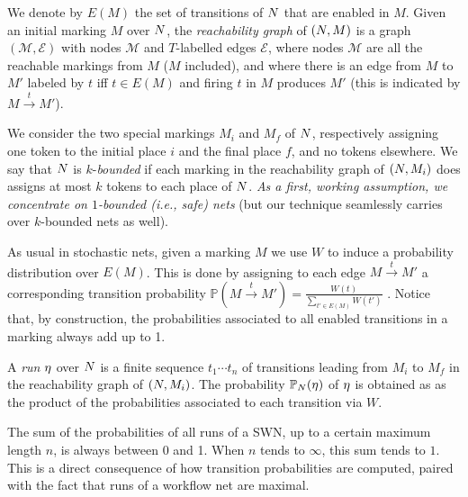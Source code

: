 We denote by $E(M)$ the set of transitions of $N$ that are enabled in $M$. Given an initial marking $M$ over $N$,  the \textit{reachability graph} of $(N,M)$ is a graph $(\mathcal{M},\mathcal{E})$ with nodes $\mathcal{M}$ and $T$-labelled edges $\mathcal{E}$, where nodes $\mathcal{M}$ are all the reachable markings from $M$ ($M$ included), and where there is an edge from $M$ to $M'$ labeled by $t$ iff $t \in E(M)$ and firing $t$ in $M$ produces $M'$ (this is indicated by $M\overset{t}{\to}M'$).

We consider the two special markings $M_i$ and $M_f$ of $N$, respectively assigning one token to the initial place $i$ and the final place $f$, and no tokens elsewhere. We say that $N$ is $k$-\emph{bounded} if each marking in the reachability graph of $(N,M_i)$ does assigns at most $k$ tokens to each place of $N$. \emph{As a first, working assumption, we concentrate on $1$-bounded (i.e., safe) nets} (but our technique seamlessly carries over $k$-bounded nets as well).

As usual in stochastic nets, given a marking $M$ we use $W$ to induce a probability distribution over $E(M)$. This is done by assigning to each edge $M\overset{t}{\to}M'$ a corresponding transition probability $\mathbb{P}\left(M\overset{t}{\to}M'\right)=\frac{W(t)}{\sum_{t'\in E(M)}W(t')}$ \cite{spdwe}. Notice that, by construction, the probabilities associated to all enabled transitions in a marking always add up to 1.

A \emph{run} $\eta$ over $N$ is a finite sequence $t_1\cdots t_n$ of transitions leading from $M_i$ to $M_f$ in the reachability graph of $(N,M_i)$. The probability $\mathbb{P}_{N}(\eta)$ of $\eta$ is obtained as as the product of the probabilities associated to each transition via $W$.

\begin{remark}
\label{rem:collective}
The sum of the probabilities of all runs of a SWN, up to a certain maximum length $n$, is always between 0 and 1. When $n$ tends to $\infty$, this sum tends to $1$. This is a direct consequence of how transition probabilities are computed, paired with the fact that runs of a workflow net are maximal.
\end{remark}


